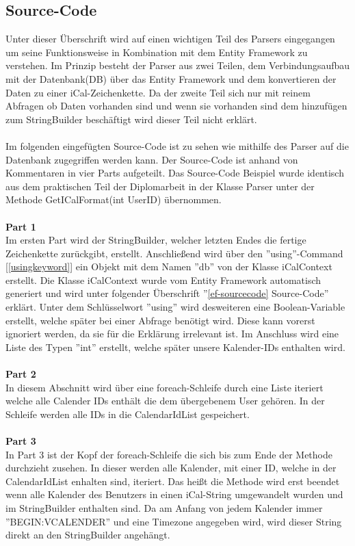 \subsection{Source-Code}
\label{sec:parser-sourcecode}
Unter dieser Überschrift wird auf einen wichtigen Teil des Parsers eingegangen um seine Funktionsweise in Kombination mit dem Entity Framework zu verstehen. Im Prinzip besteht der Parser aus zwei Teilen, dem Verbindungsaufbau mit der Datenbank(DB) über das Entity Framework und dem konvertieren der Daten zu einer iCal-Zeichenkette. Da der zweite Teil sich nur mit reinem Abfragen ob Daten vorhanden sind und wenn sie vorhanden sind dem hinzufügen zum StringBuilder beschäftigt wird dieser Teil nicht erklärt.\\ \\
Im folgenden eingefügten Source-Code ist zu sehen wie mithilfe des Parser auf die Datenbank zugegriffen werden kann. Der Source-Code ist anhand von Kommentaren in vier Parts aufgeteilt. Das Source-Code Beispiel wurde identisch aus dem praktischen Teil der Diplomarbeit in der Klasse Parser unter der Methode GetICalFormat(int UserID) übernommen. \\ \\
\textbf{Part 1} \\
Im ersten Part wird der StringBuilder, welcher letzten Endes die fertige Zeichenkette zurückgibt, erstellt. Anschließend wird über den ''using''-Command [\ref{usingkeyword}] ein Objekt mit dem Namen ''db'' von der Klasse iCalContext erstellt. Die Klasse iCalContext wurde vom Entity Framework automatisch generiert und wird unter folgender Überschrift ''\ref{ef-sourcecode} Source-Code'' erklärt. Unter dem Schlüsselwort ''using'' wird desweiteren eine Boolean-Variable erstellt, welche später bei einer Abfrage benötigt wird. Diese kann vorerst ignoriert werden, da sie für die Erklärung irrelevant ist. Im Anschluss wird eine Liste des Typen ''int'' erstellt, welche später unsere Kalender-IDs enthalten wird. \\ \\
\textbf{Part 2} \\
In diesem Abschnitt wird über eine foreach-Schleife durch eine Liste iteriert welche alle Calender IDs enthält die dem übergebenem User gehören. In der Schleife werden alle IDs in die CalendarIdList gespeichert. \\ \\
\textbf{Part 3} \\
In Part 3 ist der Kopf der foreach-Schleife die sich bis zum Ende der Methode durchzieht zusehen. In dieser werden alle Kalender, mit einer ID, welche in der CalendarIdList enhalten sind, iteriert. Das heißt die Methode wird erst beendet wenn alle Kalender des Benutzers in einen iCal-String umgewandelt wurden und im StringBuilder enthalten sind. Da am Anfang von jedem Kalender immer ''BEGIN:VCALENDER'' und eine Timezone angegeben wird, wird dieser String direkt an den StringBuilder angehängt. \\ \\
